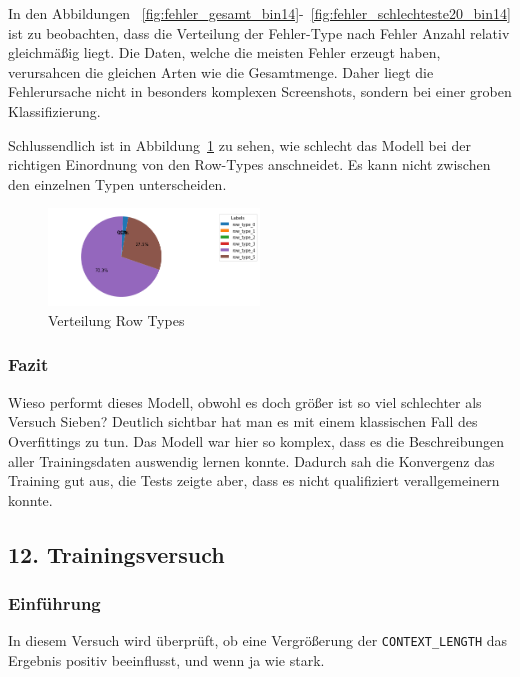 \documentclass[pdftex,a4paper,halfparskip, article]{scrartcl}
\begin{document}
In den Abbildungen ~\ref{fig:fehler_gesamt_bin14}-~\ref{fig:fehler_schlechteste20_bin14} ist zu beobachten, dass die Verteilung der Fehler-Type nach Fehler Anzahl relativ gleichmäßig liegt. Die Daten, welche die meisten Fehler erzeugt haben, verursahcen die gleichen Arten wie die Gesamtmenge. Daher liegt die Fehlerursache nicht in besonders komplexen Screenshots, sondern bei einer groben Klassifizierung.

Schlussendlich ist in Abbildung~\ref{fig:bin14_row_type} zu sehen, wie schlecht das Modell bei der richtigen Einordnung von den Row-Types anschneidet. Es kann nicht zwischen den einzelnen Typen unterscheiden.


\begin{figure}[h]
\centering
\includegraphics[width=0.5\textwidth]{predictions_bin14_predicted_row_type_distribution}
\caption{Verteilung Row Types}
\label{fig:bin14_row_type}
\end{figure}


\subsubsection*{Fazit}

Wieso performt dieses Modell, obwohl es doch größer ist so viel schlechter als Versuch Sieben? Deutlich sichtbar hat man es mit einem klassischen Fall des Overfittings zu tun. Das Modell war hier so komplex, dass es die Beschreibungen aller Trainingsdaten auswendig lernen konnte. Dadurch sah die Konvergenz das Training gut aus, die Tests zeigte aber, dass es nicht qualifiziert verallgemeinern konnte.


\subsection{12. Trainingsversuch}
\subsubsection*{Einführung}

In diesem Versuch wird überprüft, ob eine Vergrößerung der \texttt{CONTEXT\_LENGTH} das Ergebnis positiv beeinflusst, und wenn ja wie stark. 
\end{document}
